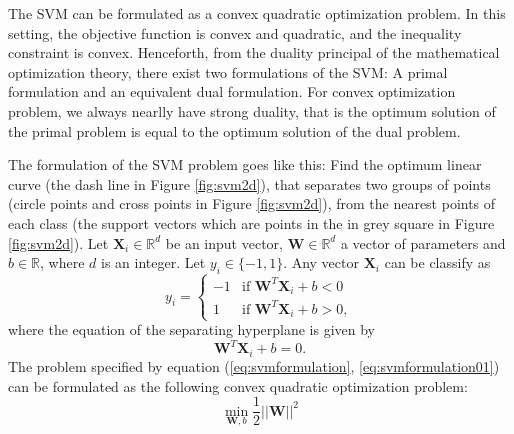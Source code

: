 \documentclass[../Main/thesis.tex]{subfiles}
\begin{document}
\justify
The SVM can be formulated as a convex quadratic optimization problem. In this setting, the objective function is convex and quadratic, and the inequality constraint is convex. Henceforth, from the duality principal of the mathematical optimization theory, there exist two formulations of the SVM: A primal formulation and an equivalent dual formulation. For convex optimization problem, we always nearlly have strong duality, that is the optimum solution of the primal problem is equal to the optimum solution of the dual problem.

\justify
The formulation of the SVM problem goes like this: Find the optimum linear curve (the dash line in Figure \ref{fig:svm2d}), that separates  two groups of points (circle points and cross points in Figure \ref{fig:svm2d}), from the nearest points of each class (the support vectors which are points in the in grey square in Figure \ref{fig:svm2d}).
\justify
Let $\bm{X}_{i} \in \mathbb{R}^{d}$  be an input vector, $\bm{W}\in \mathbb{R}^{d}$ a vector of parameters and $b\in \mathbb{R}$, where $d$ is an integer. Let $y_{i}\in \{-1,1\}$. Any vector $\bm{X}_{i}$ can be classify as 
\begin{equation}\label{eq:svmformulation}
y_{i} =
  \begin{cases}
                                   -1 & \text{if $\bm{W}^{T}\bm{X}_{i} + b < 0$} \\
                                   1 & \text{if $\bm{W}^{T}\bm{X}_{i} + b > 0$},
  \end{cases}
\end{equation}
where the equation of the separating hyperplane is given by 
\begin{equation}\label{eq:svmformulation01}
\bm{W}^{T}\bm{X}_{i} + b = 0.
\end{equation}
The problem specified by equation (\ref{eq:svmformulation}, \ref{eq:svmformulation01}) can be formulated as the following convex quadratic optimization problem:
\begin{equation}\label{eq:svmformulation1}
\min_{\bm{W},b}\frac{1}{2}||  \bm{W}||^{2}
\end{equation}
\end{document}
